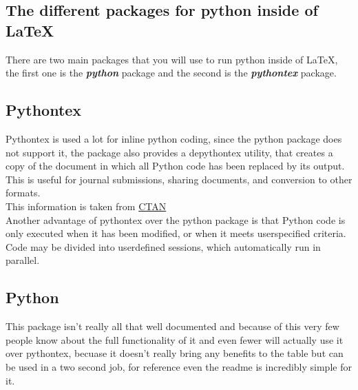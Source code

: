 \documentclass[12pt, letterpaper, oneside]{article} \usepackage[utf8]{inputenc}
\begin{document}
\subsection{The different packages for python inside of \LaTeX{}}

There are two main packages that you will use to run python inside of \LaTeX{}, the first one is the \textbf{\emph{python}} package and the second is the \textbf{\emph{pythontex}} package. 

\subsection{Pythontex}

Pythontex is used a lot for inline python coding, since the python package does not support it, the package also provides a depythontex utility, that creates a copy of the document in which all Python code has been replaced by its output. This is useful for journal submissions, sharing documents, and conversion to other formats. 
\\
This information is taken from \href{https://ctan.org/pkg/pythontex}{CTAN}
\\
Another advantage of pythontex over the python package is that Python code is only executed when it has been modified, or when it meets userspecified criteria. Code may be divided into userdefined sessions, which automatically run in parallel.

\subsection{Python}

This package isn't really all that well documented and because of this very few people know about the full functionality of it and even fewer will actually use it over pythontex, becuase it doesn't really bring any benefits to the table but can be used in a two second job, for reference even the readme is incredibly simple for it.
\end{document}
